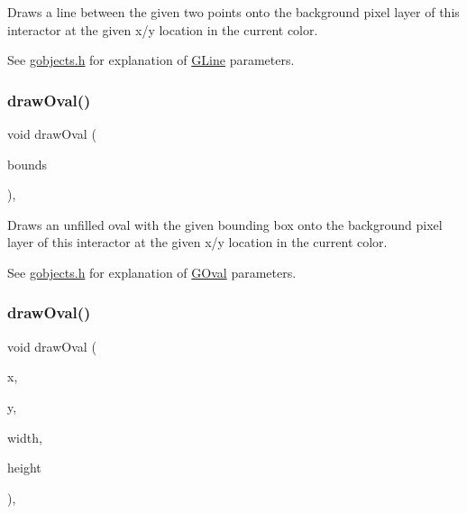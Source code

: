 Draws a line between the given two points onto the background pixel layer of this interactor at the given x/y location in the current color. 

See \mbox{\hyperlink{gobjects_8h_source}{gobjects.\+h}} for explanation of \mbox{\hyperlink{classGLine}{G\+Line}} parameters. \mbox{\label{classGDrawingSurface_a8adc13027efe311b4a6a715205b8bc46}} 
\subsubsection{\texorpdfstring{draw\+Oval()}{drawOval()}\hspace{0.1cm}{\footnotesize\ttfamily [1/2]}}
{\footnotesize\ttfamily void draw\+Oval (\begin{DoxyParamCaption}\item[{const \mbox{\hyperlink{classGRectangle}{G\+Rectangle}} \&}]{bounds }\end{DoxyParamCaption})\hspace{0.3cm}{\ttfamily [virtual]}, {\ttfamily [inherited]}}



Draws an unfilled oval with the given bounding box onto the background pixel layer of this interactor at the given x/y location in the current color. 

See \mbox{\hyperlink{gobjects_8h_source}{gobjects.\+h}} for explanation of \mbox{\hyperlink{classGOval}{G\+Oval}} parameters. \mbox{\label{classGDrawingSurface_aa5b1cf902e578907da3c63060686354e}} 
\subsubsection{\texorpdfstring{draw\+Oval()}{drawOval()}\hspace{0.1cm}{\footnotesize\ttfamily [2/2]}}
{\footnotesize\ttfamily void draw\+Oval (\begin{DoxyParamCaption}\item[{double}]{x,  }\item[{double}]{y,  }\item[{double}]{width,  }\item[{double}]{height }\end{DoxyParamCaption})\hspace{0.3cm}{\ttfamily [virtual]}, {\ttfamily [inherited]}}



